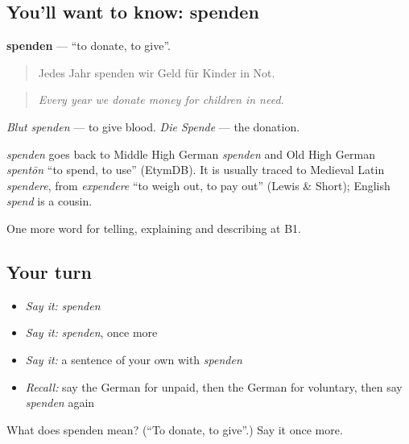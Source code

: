 \subsection*{You'll want to know: spenden}
\textbf{spenden} — \textquotedblleft{}to donate, to give\textquotedblright{}.

\begin{quote}
Jedes Jahr spenden wir Geld für Kinder in Not.
\end{quote}

\begin{quote}
\emph{Every year we donate money for children in need.}
\end{quote}

\emph{Blut spenden} — to give blood. \emph{Die Spende} — the donation.

\begin{cousinweb}
\emph{spenden} goes back to Middle High German \emph{spenden} and Old High German \emph{spentōn} \textquotedblleft{}to spend, to use\textquotedblright{} (EtymDB). It is usually traced to Medieval Latin \emph{spendere}, from \emph{expendere} \textquotedblleft{}to weigh out, to pay out\textquotedblright{} (Lewis \& Short); English \emph{spend} is a cousin.
\end{cousinweb}

\begin{grammarlens}[title={What you've built}]
One more word for telling, explaining and describing at B1.
\end{grammarlens}

\subsection*{Your turn}
\begin{itemize}
\raggedright
  \item \emph{Say it:} \emph{spenden}
  \item \emph{Say it:} \emph{spenden}, once more
  \item \emph{Say it:} a sentence of your own with \emph{spenden}
  \item \emph{Recall:} say the German for unpaid, then the German for voluntary, then say \emph{spenden} again
\end{itemize}

\begin{tcolorbox}[breakable,colback=teal!4,colframe=teal!35!black,title={Before you move on}]
What does spenden mean? (\textquotedblleft{}To donate, to give\textquotedblright{}.) Say it once more.
\end{tcolorbox}
